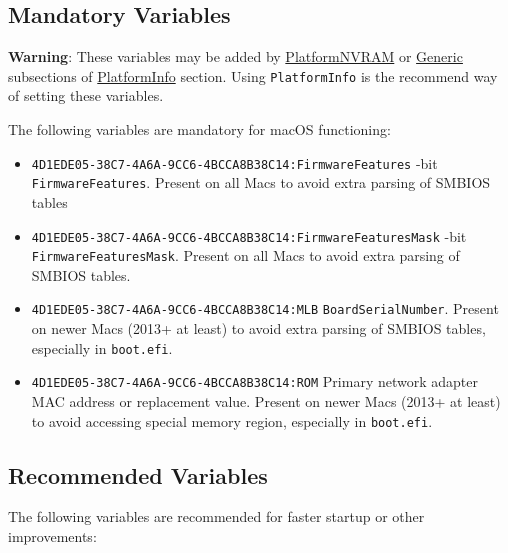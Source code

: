 \documentclass[]{article}
\providecommand{\tightlist}{%
  \setlength{\itemsep}{0pt}\setlength{\parskip}{0pt}}
\begin{document}
\subsection{Mandatory Variables}\label{nvramvars}

\textbf{Warning}: These variables may be added by
\hyperref[platforminfonvram]{PlatformNVRAM} or
\hyperref[platforminfogeneric]{Generic} subsections of
\hyperref[platforminfo]{PlatformInfo} section.
Using \texttt{PlatformInfo} is the recommend way of setting these variables.

The following variables are mandatory for macOS functioning:

\begin{itemize}
\tightlist
\item
  \texttt{4D1EDE05-38C7-4A6A-9CC6-4BCCA8B38C14:FirmwareFeatures}
  -bit \texttt{FirmwareFeatures}. Present on all Macs to avoid extra parsing of SMBIOS tables
\item
  \texttt{4D1EDE05-38C7-4A6A-9CC6-4BCCA8B38C14:FirmwareFeaturesMask}
  -bit \texttt{FirmwareFeaturesMask}. Present on all Macs to avoid extra parsing
  of SMBIOS tables.
\item
  \texttt{4D1EDE05-38C7-4A6A-9CC6-4BCCA8B38C14:MLB}
  \break
  \texttt{BoardSerialNumber}. Present on newer Macs (2013+ at least) to avoid extra parsing
  of SMBIOS tables, especially in \texttt{boot.efi}.
\item
  \texttt{4D1EDE05-38C7-4A6A-9CC6-4BCCA8B38C14:ROM}
  \break
  Primary network adapter MAC address or replacement value. Present on newer Macs
  (2013+ at least) to avoid accessing special memory region, especially in \texttt{boot.efi}.
\end{itemize}

\subsection{Recommended Variables}\label{nvramvarsrec}

The following variables are recommended for faster startup or other
improvements:
\end{document}
